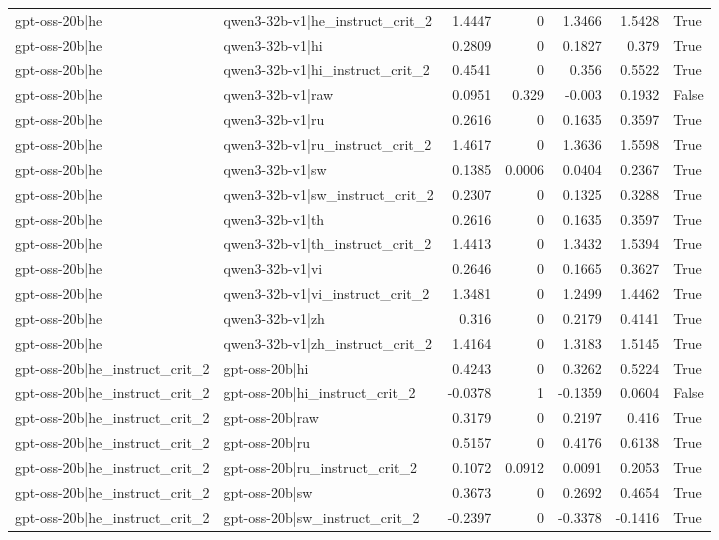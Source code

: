 \begin{table}
\begin{tabular}{l l r r r r l}
gpt-oss-20b|he & qwen3-32b-v1|he_instruct_crit_2 & 1.4447 & 0 & 1.3466 & 1.5428 & True \\
gpt-oss-20b|he & qwen3-32b-v1|hi & 0.2809 & 0 & 0.1827 & 0.379 & True \\
gpt-oss-20b|he & qwen3-32b-v1|hi_instruct_crit_2 & 0.4541 & 0 & 0.356 & 0.5522 & True \\
gpt-oss-20b|he & qwen3-32b-v1|raw & 0.0951 & 0.329 & -0.003 & 0.1932 & False \\
gpt-oss-20b|he & qwen3-32b-v1|ru & 0.2616 & 0 & 0.1635 & 0.3597 & True \\
gpt-oss-20b|he & qwen3-32b-v1|ru_instruct_crit_2 & 1.4617 & 0 & 1.3636 & 1.5598 & True \\
gpt-oss-20b|he & qwen3-32b-v1|sw & 0.1385 & 0.0006 & 0.0404 & 0.2367 & True \\
gpt-oss-20b|he & qwen3-32b-v1|sw_instruct_crit_2 & 0.2307 & 0 & 0.1325 & 0.3288 & True \\
gpt-oss-20b|he & qwen3-32b-v1|th & 0.2616 & 0 & 0.1635 & 0.3597 & True \\
gpt-oss-20b|he & qwen3-32b-v1|th_instruct_crit_2 & 1.4413 & 0 & 1.3432 & 1.5394 & True \\
gpt-oss-20b|he & qwen3-32b-v1|vi & 0.2646 & 0 & 0.1665 & 0.3627 & True \\
gpt-oss-20b|he & qwen3-32b-v1|vi_instruct_crit_2 & 1.3481 & 0 & 1.2499 & 1.4462 & True \\
gpt-oss-20b|he & qwen3-32b-v1|zh & 0.316 & 0 & 0.2179 & 0.4141 & True \\
gpt-oss-20b|he & qwen3-32b-v1|zh_instruct_crit_2 & 1.4164 & 0 & 1.3183 & 1.5145 & True \\
gpt-oss-20b|he_instruct_crit_2 & gpt-oss-20b|hi & 0.4243 & 0 & 0.3262 & 0.5224 & True \\
gpt-oss-20b|he_instruct_crit_2 & gpt-oss-20b|hi_instruct_crit_2 & -0.0378 & 1 & -0.1359 & 0.0604 & False \\
gpt-oss-20b|he_instruct_crit_2 & gpt-oss-20b|raw & 0.3179 & 0 & 0.2197 & 0.416 & True \\
gpt-oss-20b|he_instruct_crit_2 & gpt-oss-20b|ru & 0.5157 & 0 & 0.4176 & 0.6138 & True \\
gpt-oss-20b|he_instruct_crit_2 & gpt-oss-20b|ru_instruct_crit_2 & 0.1072 & 0.0912 & 0.0091 & 0.2053 & True \\
gpt-oss-20b|he_instruct_crit_2 & gpt-oss-20b|sw & 0.3673 & 0 & 0.2692 & 0.4654 & True \\
gpt-oss-20b|he_instruct_crit_2 & gpt-oss-20b|sw_instruct_crit_2 & -0.2397 & 0 & -0.3378 & -0.1416 & True \\

\end{tabular}
\end{table}
